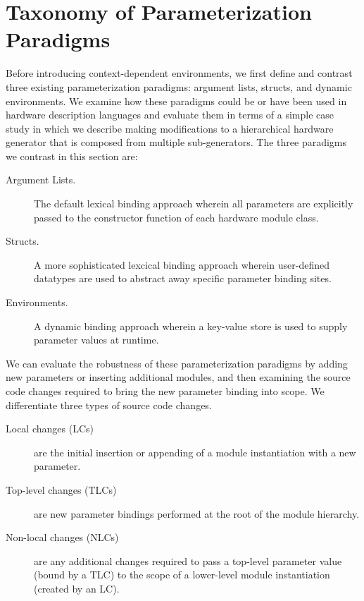 \section{Taxonomy of Parameterization Paradigms}
\label{sec:tax}

Before introducing context-dependent environments, we first define and contrast three existing parameterization paradigms: argument lists, structs, and dynamic environments.
We examine how these paradigms could be or have been used in hardware description languages and evaluate them in terms of a simple case study
in which we describe making modifications to a hierarchical hardware generator that is composed from multiple sub-generators.
The three paradigms we contrast in this section are:

\begin{description}
\item[Argument Lists.] The default lexical binding approach wherein all parameters are explicitly passed to the constructor function of each hardware module class.
\item[Structs.] A more sophisticated lexcical binding approach wherein user-defined datatypes are used to abstract away specific parameter binding sites.
\item[Environments.] A dynamic binding approach wherein a key-value store is used to supply parameter values at runtime.
\end{description}



We can evaluate the robustness of these parameterization paradigms by adding new parameters or inserting additional modules, and then examining the source code changes required to bring the new parameter binding into scope. 
We differentiate three types of source code changes.

\begin{description}
\item[Local changes (LCs)] are the initial insertion or appending of a module instantiation with a new parameter. 
\item[Top-level changes (TLCs)] are new parameter bindings performed at the root of the module hierarchy. 
\item[Non-local changes (NLCs)] are any additional changes required to pass a top-level parameter value (bound by a TLC) to the scope of a lower-level module instantiation (created by an LC). 
\end{description}

